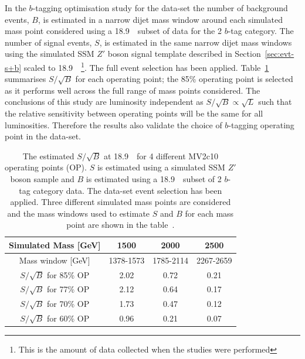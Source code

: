 In the $b$-tagging optimisation study for the \hm{} data-set
the number of background events, $B$, is estimated in
a narrow dijet mass window around
each simulated mass point considered using a
18.9~\ifb~subset of data for the 2 $b$-tag category.
The number of signal events, $S$, is estimated
in the same narrow dijet mass windows using 
the simulated SSM $Z'$ boson signal template
described in Section~\ref{sec:evt-s+b} scaled to 18.9~\ifb~\footnote{This is
  the amount of data collected when the studies were performed}.
The full \hm{} event selection has been applied.
Table~\ref{tab:evt-btag_hm} summarises $S/\sqrt{B}$ for each operating point;
the 85\% operating point is selected as it performs well across the full range of mass points considered.
The conclusions of this study are luminosity independent
as $S/\sqrt{B} \propto \sqrt{L}$ such that the relative sensitivity
between operating points will be the same for all luminosities.
Therefore the results also validate the choice of $b$-tagging operating point in the \summer{} data-set.

\vspace{-0.4em}
\begin{table}[ht]
\begin{center}
\begin{tabular}{|c||c|c|c|}
  \hline
  Simulated Mass [GeV]        &  1500  &   2000  &  2500  \\
  \hline
  Mass window [GeV]               & 1378-1573       &  1785-2114   &  2267-2659 \\
  \hline
  $S/\sqrt{B}$ for 85\% OP        &  2.02           &  0.72        &  0.21          \\
  $S/\sqrt{B}$ for 77\% OP        &  2.12           &  0.64        &  0.17          \\
  $S/\sqrt{B}$ for 70\% OP        &  1.73           &  0.47        &  0.12          \\
  $S/\sqrt{B}$ for 60\% OP        &  0.96           &  0.21        &  0.07          \\ \hline
\end{tabular}
\caption[The estimated $S/\sqrt{B}$ at 18.9~\ifb~for 4 different MV2c10 operating points (OP).
  $S$ is estimated using a simulated SSM $Z'$ boson sample and $B$ is estimated using a 18.9~\ifb~subset of 2 $b$-tag category data.
  The \hm{} data-set event selection has been applied.
  Three different simulated mass points are considered and the mass windows used
  to estimate $S$ and $B$ for each mass point are shown in the table.]
        {The estimated $S/\sqrt{B}$ at 18.9~\ifb~for 4 different MV2c10 operating points (OP).
          $S$ is estimated using a simulated SSM $Z'$ boson sample and $B$ is estimated using a 18.9~\ifb~subset of 2 $b$-tag category data.
          The \hm{} data-set event selection has been applied.
          Three different simulated mass points are considered and the mass windows used
          to estimate $S$ and $B$ for each mass point are shown in the table~\cite{dibjet-full_int}.}
        \label{tab:evt-btag_hm}        
\end{center}
\vspace{-2em}
\end{table}

